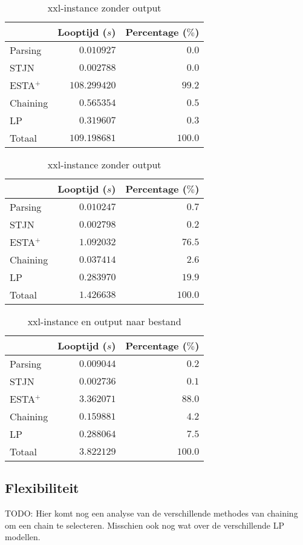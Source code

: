 \begin{table}[H]
\parbox{.45\linewidth}{
    \centering
    \begin{tabular}{| l | r | r |}
        \hline
                    & Looptijd ($s$)  & Percentage ($\%$) \\
        \hline
        Parsing     & $0.010927$      & $0.0$   \\
        STJN        & $0.002788$      & $0.0$   \\
        ESTA$^+$    & $108.299420$    & $99.2$  \\
        Chaining    & $0.565354$      & $0.5$   \\
        LP          & $0.319607$      & $0.3$   \\
        \hline \hline
        Totaal      & $109.198681$    & $100.0$ \\
        \hline
    \end{tabular}
    \caption{xxl-instance met output}
    \label{tbl:xxl+output}
}
\hfill
\parbox{.45\linewidth}{
    \centering
    \begin{tabular}{| l | r | r |}
        \hline
                    & Looptijd ($s$)& Percentage ($\%$) \\
        \hline
        Parsing     & $0.010247$      & $0.7$   \\
        STJN        & $0.002798$      & $0.2$   \\
        ESTA$^+$    & $1.092032$      & $76.5$  \\
        Chaining    & $0.037414$      & $2.6$   \\
        LP          & $0.283970$      & $19.9$  \\
        \hline \hline
        Totaal      & $1.426638$      & $100.0$ \\
        \hline
    \end{tabular}
    \caption{xxl-instance zonder output}
    \label{tbl:xxl-output}
}
\end{table}

\begin{table}[H]
    \centering
    \begin{tabular}{| l | r | r|}
        \hline
                    & Looptijd ($s$)& Percentage ($\%$) \\
        \hline
        
        Parsing     & $0.009044$    & $0.2$     \\
        STJN        & $0.002736$    & $0.1$     \\
        ESTA$^+$    & $3.362071$    & $88.0$    \\
        Chaining    & $0.159881$    & $4.2$     \\
        LP          & $0.288064$    & $7.5$     \\
        \hline \hline
        Totaal      & $3.822129$    & $100.0$   \\
        \hline
    \end{tabular}
    \caption{xxl-instance en output naar bestand}
    \label{tbl:xxl+outputbestand}
\end{table}

\subsection{Flexibiliteit}
TODO: Hier komt nog een analyse van de verschillende methodes van chaining om een chain te selecteren. Misschien ook nog wat over de verschillende LP modellen.

